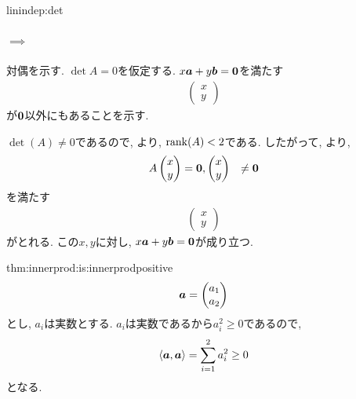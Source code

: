 \begin{proofof}{linindep:det}
  
  \paragraph{$\implies$}
  対偶を示す.
  $\det A=0$を仮定する.
  $x\boldsymbol{a}+y\boldsymbol{b}=\boldsymbol{0}$を満たす
  \begin{align*}
    \begin{pmatrix}x\\y\end{pmatrix}
  \end{align*}
  が$\boldsymbol{0}$以外にもあることを示す.
  
    
  $\det(A)\neq 0$であるので,
  より,
  $\operatorname{rank}(A)<2$である.
  したがって, より, 
  \begin{align*}
    A\begin{pmatrix}x\\y\end{pmatrix}&=\boldsymbol{0},
    \begin{pmatrix}x\\y\end{pmatrix}&\neq\boldsymbol{0}
  \end{align*}
  を満たす
  \begin{align*}
    \begin{pmatrix}x\\y\end{pmatrix}
  \end{align*}
  がとれる. この$x,y$に対し,
  $x\boldsymbol{a}+y\boldsymbol{b}=\boldsymbol{0}$が成り立つ.
\end{proofof}
\begin{proofof*}{thm:innerprod:is:innerprod}{positive}
  \begin{align*}
        \boldsymbol{a}=\begin{pmatrix}a_1\\a_2\end{pmatrix}
  \end{align*}
  とし,   $a_i$は実数とする.
  $a_i$は実数であるから$a_i^2\geq 0$であるので,
  \begin{align*}
        \Braket{\boldsymbol{a},\boldsymbol{a}}=\sum_{i=1}^2 a_i^2\geq 0
  \end{align*}
  となる. 
\end{proofof*}

